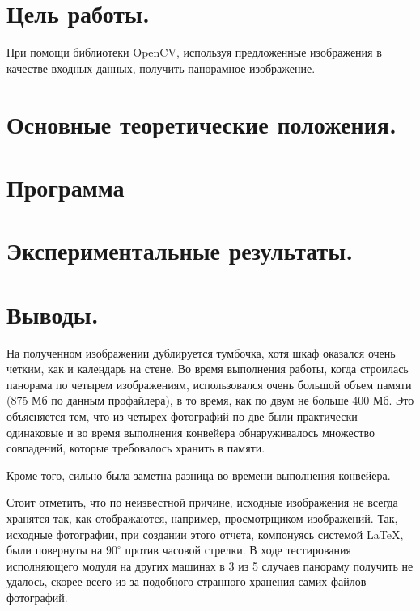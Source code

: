 \documentclass[14pt]{article}
\begin{document}
	
	
	\section{Цель работы.}
		При помощи библиотеки OpenCV, используя предложенные изображения в качестве входных данных, получить панорамное изображение.
	
	\section{Основные теоретические положения.}
		
	
	\section{Программа}
		
		
	\section{Экспериментальные результаты.}
		

	\section{Выводы.}
		На полученном изображении дублируется тумбочка, хотя шкаф оказался очень четким, как и календарь на стене. Во время выполнения работы, когда строилась панорама по четырем изображениям, использовался очень большой объем памяти (875 Мб по данным профайлера), в то время, как по двум не больше 400 Мб. Это объясняется тем, что из четырех фотографий по две были практически одинаковые и во время выполнения конвейера обнаруживалось множество совпадений, которые требовалось хранить в памяти. 
		
		Кроме того, сильно была заметна разница во времени выполнения конвейера. 
		
		Стоит отметить, что по неизвестной причине, исходные изображения не всегда хранятся так, как отображаются, например, просмотрщиком изображений. Так, исходные фотографии, при создании этого отчета, компонуясь системой \LaTeX , были повернуты на $90^{\circ}$ против часовой стрелки. В ходе тестирования исполняющего модуля на других машинах в 3 из 5 случаев панораму получить не удалось, скорее-всего из-за подобного странного хранения самих файлов фотографий.
\end{document}
